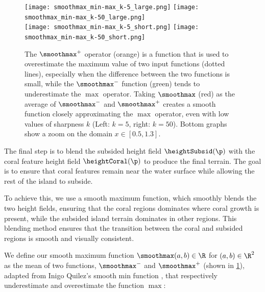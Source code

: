 \begin{figure}[H]
    \texttt{[image: smoothmax\_min-max\_k-5\_large.png]}
    \texttt{[image: smoothmax\_min-max\_k-50\_large.png]} \\
    \texttt{[image: smoothmax\_min-max\_k-5\_short.png]}
    \texttt{[image: smoothmax\_min-max\_k-50\_short.png]}
    \caption{The $\smoothmax^+$ operator (orange) is a function that is used to overestimate the maximum value of two input functions (dotted lines), especially when the difference between the two functions is small, while the $\smoothmax^-$ function (green) tends to underestimate the $\max$ operator. Taking $\smoothmax$ (red) as the average of $\smoothmax^-$ and $\smoothmax^+$ creates a smooth function closely approximating the $\max$ operator, even with low values of sharpness $k$ (Left: $k=5$, right: $k=50$). Bottom graphs show a zoom on the domain $x \in [0.5, 1.3]$.}
    \label{fig:coral-island-blend-function-island-with-upper}
\end{figure}

The final step is to blend the subsided height field $\heightSubsid(\p)$ with the coral feature height field $\heightCoral(\p)$ to produce the final terrain. The goal is to ensure that coral features remain near the water surface while allowing the rest of the island to subside.

To achieve this, we use a smooth maximum function, which smoothly blends the two height fields, ensuring that the coral regions dominates where coral growth is present, while the subsided island terrain dominates in other regions. This blending method ensures that the transition between the coral and subsided regions is smooth and visually consistent.

We define our smooth maximum function $\smoothmax(a, b) \in \R$ for $(a, b) \in \R^2$ as the mean of two functions, $\smoothmax^-$ and $\smoothmax^+$ (shown in \cref{fig:coral-island-blend-function-island-with-upper}), adapted from Inigo Quilez's smooth min function \cite{Quilez2013}, that respectively underestimate and overestimate the function $\max$:

